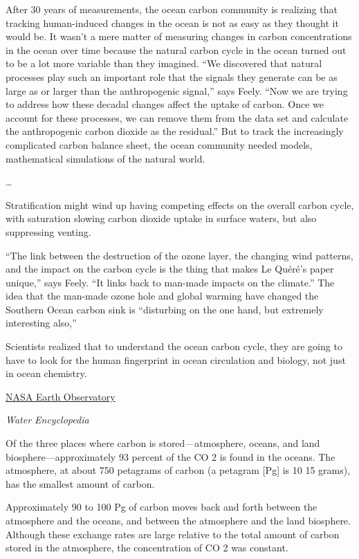 \documentclass[
]{book}
\begin{document}
After 30 years of measurements, the ocean carbon community is realizing that tracking human-induced changes in the ocean is not as easy as they thought it would be. It wasn't a mere matter of measuring changes in carbon concentrations in the ocean over time because the natural carbon cycle in the ocean turned out to be a lot more variable than they imagined. ``We discovered that natural processes play such an important role that the signals they generate can be as large as or larger than the anthropogenic signal,'' says Feely. ``Now we are trying to address how these decadal changes affect the uptake of carbon. Once we account for these processes, we can remove them from the data set and calculate the anthropogenic carbon dioxide as the residual.'' But to track the increasingly complicated carbon balance sheet, the ocean community needed models, mathematical simulations of the natural world.

\ldots{}

Stratification might wind up having competing effects on the overall carbon cycle, with saturation slowing carbon dioxide uptake in surface waters, but also suppressing venting.

``The link between the destruction of the ozone layer, the changing wind patterns, and the impact on the carbon cycle is the thing that makes Le Quéré's paper unique,'' says Feely. ``It links back to man-made impacts on the climate.'' The idea that the man-made ozone hole and global warming have changed the Southern Ocean carbon sink is ``disturbing on the one hand, but extremely interesting also,''

Scientists realized that to understand the ocean carbon cycle, they are going to have to look for the human fingerprint in ocean circulation and biology, not just in ocean chemistry.

\href{https://earthobservatory.nasa.gov/features/OceanCarbon}{NASA Earth Observatory}

\emph{Water Encyclopedia}

Of the three places where carbon is stored---atmosphere, oceans, and land biosphere---approximately 93 percent of the CO 2 is found in the oceans. The atmosphere, at about 750 petagrams of carbon (a petagram {[}Pg{]} is 10 15 grams), has the smallest amount of carbon.

Approximately 90 to 100 Pg of carbon moves back and forth between the atmosphere and the oceans, and between the atmosphere and the land biosphere. Although these exchange rates are large relative to the total amount of carbon stored in the atmosphere, the concentration of CO 2 was constant.
\end{document}
